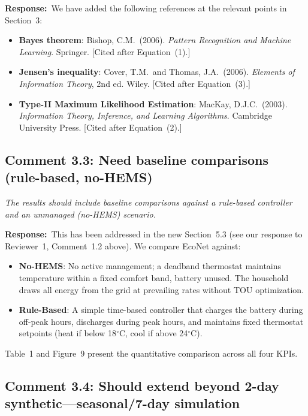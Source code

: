 \documentclass[11pt]{article}
\newcommand{\reviewercomment}[1]{\textit{#1}}
\newcommand{\response}{\textbf{Response:}\ }
\begin{document}
\response We have added the following references at the relevant points in Section~3:

\begin{itemize}
    \item \textbf{Bayes theorem}: Bishop, C.M.\ (2006). \textit{Pattern Recognition and Machine Learning}. Springer. [Cited after Equation~(1).]
    \item \textbf{Jensen's inequality}: Cover, T.M.\ and Thomas, J.A.\ (2006). \textit{Elements of Information Theory}, 2nd ed. Wiley. [Cited after Equation~(3).]
    \item \textbf{Type-II Maximum Likelihood Estimation}: MacKay, D.J.C.\ (2003). \textit{Information Theory, Inference, and Learning Algorithms}. Cambridge University Press. [Cited after Equation~(2).]
\end{itemize}

\subsection*{Comment 3.3: Need baseline comparisons (rule-based, no-HEMS)}

\reviewercomment{The results should include baseline comparisons against a rule-based controller and an unmanaged (no-HEMS) scenario.}

\response This has been addressed in the new Section~5.3 (see our response to Reviewer~1, Comment~1.2 above). We compare EcoNet against:

\begin{itemize}
    \item \textbf{No-HEMS}: No active management; a deadband thermostat maintains temperature within a fixed comfort band, battery unused. The household draws all energy from the grid at prevailing rates without TOU optimization.
    \item \textbf{Rule-Based}: A simple time-based controller that charges the battery during off-peak hours, discharges during peak hours, and maintains fixed thermostat setpoints (heat if below 18$^\circ$C, cool if above 24$^\circ$C).
\end{itemize}

Table~1 and Figure~9 present the quantitative comparison across all four KPIs.

\subsection*{Comment 3.4: Should extend beyond 2-day synthetic---seasonal/7-day simulation}
\end{document}
